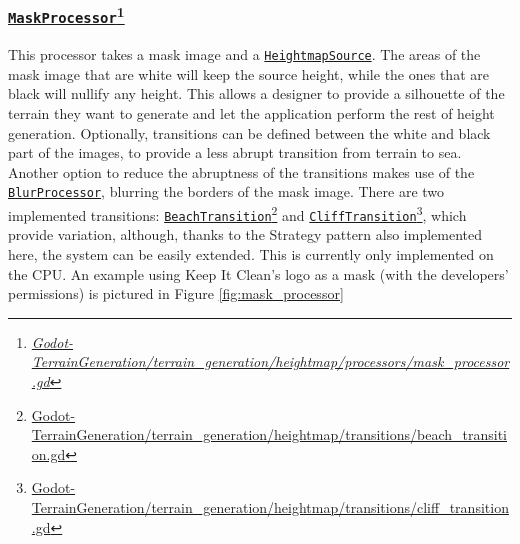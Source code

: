 \subsubsection[\texttt{MaskProcessor}]{\href{{https://github.com/fsande/TFG---Eric-Rios/blob/main/Godot-TerrainGeneration/terrain_generation/heightmap/processors/mask_processor.gd}}{\texttt{MaskProcessor}}\footnote{\href{{https://github.com/fsande/TFG---Eric-Rios/blob/main/Godot-TerrainGeneration/terrain_generation/heightmap/processors/mask_processor.gd}}{\textit{Godot-TerrainGeneration/terrain\_generation/heightmap/processors/mask\_processor.gd}}}}
This processor takes a mask image and a \href{{https://github.com/fsande/TFG---Eric-Rios/blob/main/Godot-TerrainGeneration/terrain_generation/heightmap/sources/heightmap_source.gd}}{\texttt{HeightmapSource}}.
The areas of the mask image that are white will keep the source height, while the ones that are black will nullify any height. 
This allows a designer to provide a silhouette of the terrain they want to generate and let the application perform the rest of height generation.
Optionally, transitions can be defined between the white and black part of the images, to provide a less abrupt transition from terrain to sea.
Another option to reduce the abruptness of the transitions makes use of the \href{{https://github.com/fsande/TFG---Eric-Rios/blob/main/Godot-TerrainGeneration/terrain_generation/heightmap/processors/blur_processor.gd}}{\texttt{BlurProcessor}}, blurring the borders of the mask image.
There are two implemented transitions: \href{https://github.com/fsande/TFG---Eric-Rios/blob/main/Godot-TerrainGeneration/terrain_generation/heightmap/transitions/beach_transition.gd}{\texttt{BeachTransition}}\footnote{\href{https://github.com/fsande/TFG---Eric-Rios/blob/main/Godot-TerrainGeneration/terrain_generation/heightmap/transitions/beach_transition.gd}{Godot-TerrainGeneration/terrain\_generation/heightmap/transitions/beach\_transition.gd}} and \href{https://github.com/fsande/TFG---Eric-Rios/blob/main/Godot-TerrainGeneration/terrain_generation/heightmap/transitions/cliff_transition.gd}{\texttt{CliffTransition}}\footnote{\href{https://github.com/fsande/TFG---Eric-Rios/blob/main/Godot-TerrainGeneration/terrain_generation/heightmap/transitions/cliff_transition.gd}{Godot-TerrainGeneration/terrain\_generation/heightmap/transitions/cliff\_transition.gd}}, which provide variation, although, thanks to the Strategy pattern also implemented here, the system can be easily extended.
This is currently only implemented on the CPU.
An example using Keep It Clean's \cite{Cruz:2025:PBC, Herrera:2025:PBC} logo as a mask (with the developers' permissions) is pictured in Figure \ref{fig:mask_processor}

